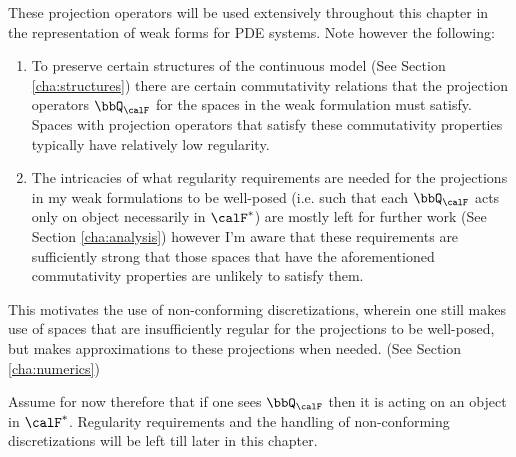     \begin{remark}
        These projection operators will be used extensively throughout this chapter in the representation of weak forms for PDE systems. Note however the following:
        \begin{enumerate}
            \item  To preserve certain structures of the continuous model (See Section \ref{cha:structures}) there are certain commutativity relations that the projection operators $\bbQ_{\calF}$ for the spaces in the weak formulation must satisfy. Spaces with projection operators that satisfy these commutativity properties typically have relatively low regularity.
            \item  The intricacies of what regularity requirements are needed for the projections in my weak formulations to be well-posed (i.e. such that each $\bbQ_{\calF}$ acts only on object necessarily in $\calF^{*}$) are mostly left for further work (See Section \ref{cha:analysis}) however I'm aware that these requirements are sufficiently strong that those spaces that have the aforementioned commutativity properties are unlikely to satisfy them.
        \end{enumerate}        
        This motivates the use of non-conforming discretizations, wherein one still makes use of spaces that are insufficiently regular for the projections to be well-posed, but makes approximations to these projections when needed. (See Section \ref{cha:numerics})
        
        Assume for now therefore that if one sees $\bbQ_{\calF}$ then it is acting on an object in $\calF^{*}$. Regularity requirements and the handling of non-conforming discretizations will be left till later in this chapter.
    \end{remark}